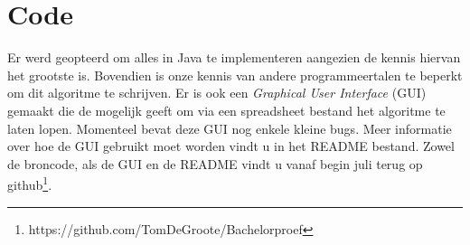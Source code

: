 \documentclass[Main.tex]{subfiles}
\begin{document}
\section{Code}
Er werd geopteerd om alles in Java te implementeren aangezien de kennis hiervan het grootste is. Bovendien is onze kennis van andere programmeertalen te beperkt om dit algoritme te schrijven. Er is ook een \textit{Graphical User Interface} (GUI) gemaakt die de mogelijk geeft om via een spreadsheet bestand het algoritme te laten lopen. Momenteel bevat deze GUI nog enkele kleine bugs. Meer informatie over hoe de GUI gebruikt moet worden vindt u in het README bestand. Zowel de broncode, als de GUI en de README vindt u vanaf begin juli terug op github\footnote{https://github.com/TomDeGroote/Bachelorproef}.
\end{document}
